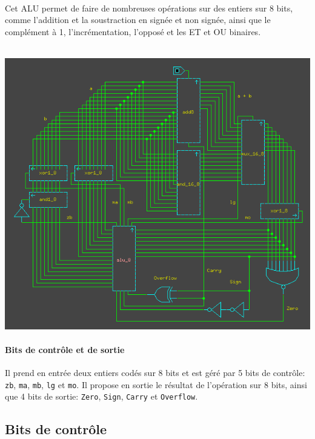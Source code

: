 \documentclass[11pt, a4paper, twoside, titlepage]{article}
\begin{document}
\paragraph{}
Cet ALU permet de faire de nombreuses opérations sur des entiers sur 8 bits, comme l'addition et la soustraction en signée et non signée, ainsi que le complément à 1, l'incrémentation, l'opposé et les ET et OU binaires.\\
\\
\centerline{\includegraphics[width=.8\textwidth]{alu_8}}

\paragraph{Bits de contrôle et de sortie}
Il prend en entrée deux entiers codés sur 8 bits et est géré par 5 bits de contrôle: \texttt{zb}, \texttt{ma}, \texttt{mb}, \texttt{lg} et \texttt{mo}. Il propose en sortie le résultat de l'opération sur 8 bits, ainsi que 4 bits de sortie: \texttt{Zero}, \texttt{Sign}, \texttt{Carry} et \texttt{Overflow}.

\subsection{Bits de contrôle}
\end{document}
